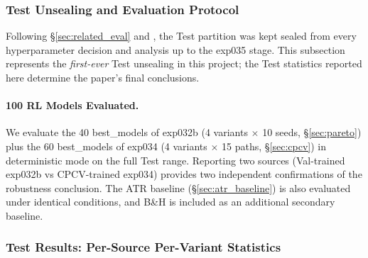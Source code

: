 \documentclass[11pt, a4paper]{article}
\begin{document}
\subsubsection{Test Unsealing and Evaluation Protocol}
\label{sec:oos_setup}

Following \S\ref{sec:related_eval} and \citet{gort2022backtest}, the Test
partition was kept sealed from every hyperparameter decision and analysis up
to the exp035 stage. This subsection represents the \emph{first-ever}
Test unsealing in this project; the Test statistics
reported here determine the paper's final conclusions.

\paragraph{100 RL Models Evaluated.}
We evaluate the 40 best\_models of exp032b (4 variants $\times$ 10 seeds,
\S\ref{sec:pareto}) plus the 60 best\_models of exp034 (4 variants $\times$
15 paths, \S\ref{sec:cpcv}) in deterministic mode on the full Test range.
Reporting two sources (Val-trained exp032b vs CPCV-trained exp034) provides
two independent confirmations of the robustness conclusion. The ATR baseline
(\S\ref{sec:atr_baseline}) is also evaluated under identical conditions, and
B\&H is included as an additional secondary baseline.

\subsubsection{Test Results: Per-Source Per-Variant Statistics}
\label{sec:oos_results}
\end{document}
